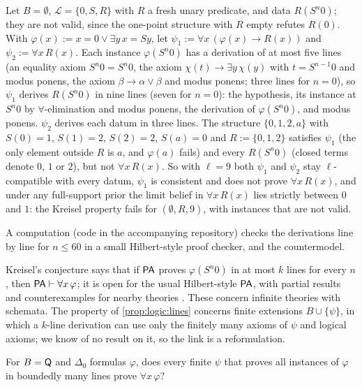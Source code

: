 \begin{example}\label{ex:logic:lines}
Let $B=\emptyset$, $\mathcal L=\{0,S,R\}$ with $R$ a fresh unary predicate, and data $R(S^n0)$; they are not valid, since the one-point structure with $R$ empty refutes $R(0)$. With $\varphi(x):=x=0\vee\exists y\,x=Sy$, let $\psi_1:=\forall x\,(\varphi(x)\to R(x))$ and $\psi_2:=\forall x\,R(x)$. Each instance $\varphi(S^n0)$ has a derivation of at most five lines (an equality axiom $S^n0=S^n0$, the axiom $\chi(t)\to\exists y\,\chi(y)$ with $t=S^{n-1}0$ and modus ponens, the axiom $\beta\to\alpha\vee\beta$ and modus ponens; three lines for $n=0$), so $\psi_1$ derives $R(S^n0)$ in nine lines (seven for $n=0$): the hypothesis, its instance at $S^n0$ by $\forall$-elimination and modus ponens, the derivation of $\varphi(S^n0)$, and modus ponens. $\psi_2$ derives each datum in three lines. The structure $\{0,1,2,a\}$ with $S(0)=1$, $S(1)=2$, $S(2)=2$, $S(a)=0$ and $R:=\{0,1,2\}$ satisfies $\psi_1$ (the only element outside $R$ is $a$, and $\varphi(a)$ fails) and every $R(S^n0)$ (closed terms denote $0$, $1$ or $2$), but not $\forall x\,R(x)$. So with $\ell=9$ both $\psi_1$ and $\psi_2$ stay $\ell$-compatible with every datum, $\psi_1$ is consistent and does not prove $\forall x\,R(x)$, and under any full-support prior the limit belief in $\forall x\,R(x)$ lies strictly between $0$ and $1$: the Kreisel property fails for $(\emptyset,R,9)$, with instances that are not valid.
\end{example}

A computation (code in the accompanying repository) checks the derivations line by line for $n\le60$ in a small Hilbert-style proof checker, and the countermodel.

Kreisel's conjecture says that if $\mathsf{PA}$ proves $\varphi(S^n0)$ in at most $k$ lines for every $n$, then $\mathsf{PA}\vdash\forall x\,\varphi$; it is open for the usual Hilbert-style $\mathsf{PA}$, with partial results and counterexamples for nearby theories \citep{parikh1973some,baaz1993kreisel,hrubes2007theories,hrubes2009kreisel,santos2021variants}. These concern infinite theories with schemata. The property of \cref{prop:logic:lines} concerns finite extensions $B\cup\{\psi\}$, in which a $k$-line derivation can use only the finitely many axioms of $\psi$ and logical axioms; we know of no result on it, so the link is a reformulation.

\begin{question}\label{q:logic:kreisel}
For $B=\mathsf{Q}$ and $\Delta_0$ formulas $\varphi$, does every finite $\psi$ that proves all instances of $\varphi$ in boundedly many lines prove $\forall x\,\varphi$?
\end{question}

